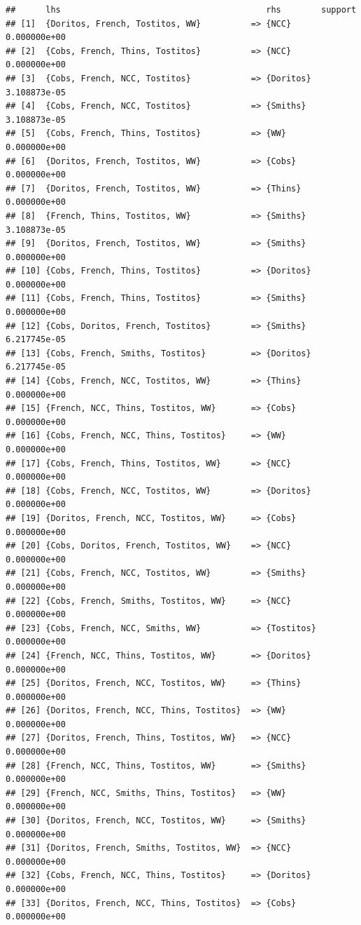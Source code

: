 \documentclass[
]{article}
\begin{document}
\begin{verbatim}
##      lhs                                         rhs        support     
## [1]  {Doritos, French, Tostitos, WW}          => {NCC}      0.000000e+00
## [2]  {Cobs, French, Thins, Tostitos}          => {NCC}      0.000000e+00
## [3]  {Cobs, French, NCC, Tostitos}            => {Doritos}  3.108873e-05
## [4]  {Cobs, French, NCC, Tostitos}            => {Smiths}   3.108873e-05
## [5]  {Cobs, French, Thins, Tostitos}          => {WW}       0.000000e+00
## [6]  {Doritos, French, Tostitos, WW}          => {Cobs}     0.000000e+00
## [7]  {Doritos, French, Tostitos, WW}          => {Thins}    0.000000e+00
## [8]  {French, Thins, Tostitos, WW}            => {Smiths}   3.108873e-05
## [9]  {Doritos, French, Tostitos, WW}          => {Smiths}   0.000000e+00
## [10] {Cobs, French, Thins, Tostitos}          => {Doritos}  0.000000e+00
## [11] {Cobs, French, Thins, Tostitos}          => {Smiths}   0.000000e+00
## [12] {Cobs, Doritos, French, Tostitos}        => {Smiths}   6.217745e-05
## [13] {Cobs, French, Smiths, Tostitos}         => {Doritos}  6.217745e-05
## [14] {Cobs, French, NCC, Tostitos, WW}        => {Thins}    0.000000e+00
## [15] {French, NCC, Thins, Tostitos, WW}       => {Cobs}     0.000000e+00
## [16] {Cobs, French, NCC, Thins, Tostitos}     => {WW}       0.000000e+00
## [17] {Cobs, French, Thins, Tostitos, WW}      => {NCC}      0.000000e+00
## [18] {Cobs, French, NCC, Tostitos, WW}        => {Doritos}  0.000000e+00
## [19] {Doritos, French, NCC, Tostitos, WW}     => {Cobs}     0.000000e+00
## [20] {Cobs, Doritos, French, Tostitos, WW}    => {NCC}      0.000000e+00
## [21] {Cobs, French, NCC, Tostitos, WW}        => {Smiths}   0.000000e+00
## [22] {Cobs, French, Smiths, Tostitos, WW}     => {NCC}      0.000000e+00
## [23] {Cobs, French, NCC, Smiths, WW}          => {Tostitos} 0.000000e+00
## [24] {French, NCC, Thins, Tostitos, WW}       => {Doritos}  0.000000e+00
## [25] {Doritos, French, NCC, Tostitos, WW}     => {Thins}    0.000000e+00
## [26] {Doritos, French, NCC, Thins, Tostitos}  => {WW}       0.000000e+00
## [27] {Doritos, French, Thins, Tostitos, WW}   => {NCC}      0.000000e+00
## [28] {French, NCC, Thins, Tostitos, WW}       => {Smiths}   0.000000e+00
## [29] {French, NCC, Smiths, Thins, Tostitos}   => {WW}       0.000000e+00
## [30] {Doritos, French, NCC, Tostitos, WW}     => {Smiths}   0.000000e+00
## [31] {Doritos, French, Smiths, Tostitos, WW}  => {NCC}      0.000000e+00
## [32] {Cobs, French, NCC, Thins, Tostitos}     => {Doritos}  0.000000e+00
## [33] {Doritos, French, NCC, Thins, Tostitos}  => {Cobs}     0.000000e+00

\end{verbatim}
\end{document}
